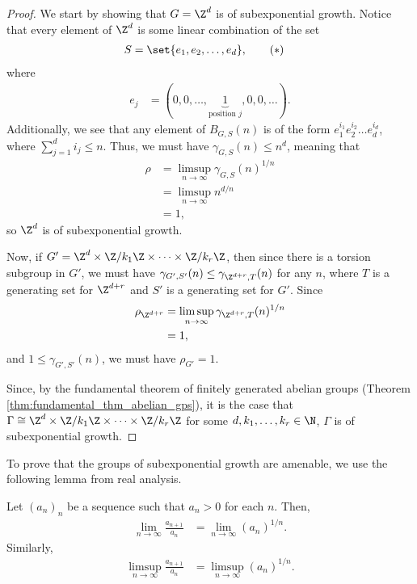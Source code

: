 \begin{proof}
  We start by showing that $G = \Z^d$ is of subexponential growth. Notice that every element of $\Z^d$ is some linear combination of the set
  \begin{align*}
    S &= \set{e_1,e_2,\dots,e_d},\label{eq:generating_set_free_abelian_group}\tag{\textasteriskcentered}
  \end{align*}
  where
  \begin{align*}
    e_{j} &= (0,0,\dots,\underbrace{1}_{\text{position $j$}},0,0,\dots).
  \end{align*}
  Additionally, we see that any element of $B_{G,S}(n)$ is of the form $e_1^{i_1}e_2^{i_2}\dots e_d^{i_d}$, where $\sum_{j=1}^{d} i_j \leq n$. Thus, we must have $\gamma_{G,S}(n) \leq n^{d}$, meaning that 
  \begin{align*}
    \rho &= \limsup_{n\rightarrow\infty} \gamma_{G,S}(n)^{1/n}\\
         &= \limsup_{n\rightarrow\infty}n^{d/n}\\
         &= 1,
  \end{align*}
  so $\Z^d$ is of subexponential growth.\newline

  Now, if $G' = \Z^d\times \Z/k_1\Z\times \cdots \times \Z/k_r\Z$, then since there is a torsion subgroup in $G'$, we must have $\gamma_{G',S'}(n) \leq \gamma_{\Z^{d+r},T}(n)$ for any $n$, where $T$ is a generating set for $\Z^{d+r}$ and $S'$ is a generating set for $G'$. Since
  \begin{align*}
    \rho_{\Z^{d+r}} &= \limsup_{n\rightarrow\infty}\gamma_{\Z^{d+r},T}(n)^{1/n}\\
                    &= 1,
  \end{align*}
  and $1 \leq \gamma_{G',S'}(n)$, we must have $\rho_{G'} = 1$.\newline

  Since, by the fundamental theorem of finitely generated abelian groups (Theorem \ref{thm:fundamental_thm_abelian_gps}), it is the case that $\Gamma\cong \Z^{d}\times \Z/k_1\Z\times\cdots\times \Z/k_r\Z$ for some $d,k_1,\dots,k_r\in \N$, $\Gamma$ is of subexponential growth.
\end{proof}
To prove that the groups of subexponential growth are amenable, we use the following lemma from real analysis.
\begin{lemma}
  Let $\left(a_n\right)_n$ be a sequence such that $a_n > 0$ for each $n$. Then,
  \begin{align*}
    \lim_{n\rightarrow\infty}\frac{a_{n+1}}{a_n} &= \lim_{n\rightarrow\infty} \left(a_n\right)^{1/n}.
  \end{align*}
  Similarly,
  \begin{align*}
    \limsup_{n\rightarrow\infty}\frac{a_{n+1}}{a_n} &= \limsup_{n\rightarrow\infty}\left(a_n\right)^{1/n}.
  \end{align*}
\end{lemma}
